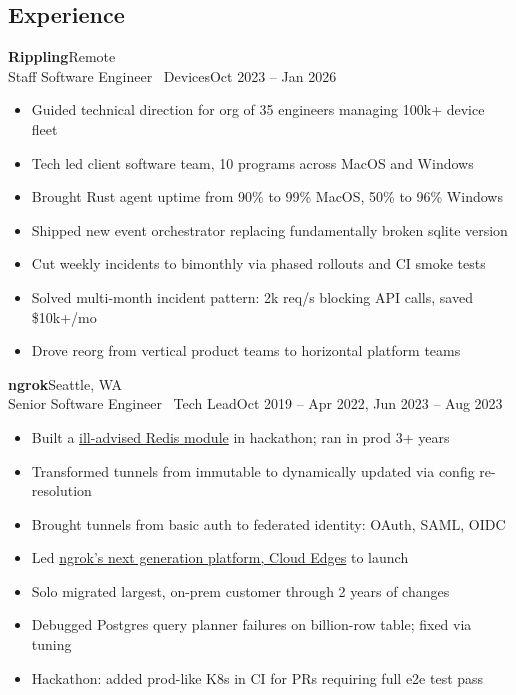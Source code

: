 \documentclass[margin]{res}
\begin{document}
  \begin{resume}
    \section{Experience}
       \textbf{Rippling}\hfill Remote\\
         Staff Software Engineer \textbar \ Devices\hfill Oct 2023 -- Jan 2026\\
         \begin{itemize} \itemsep -1pt  %
            \item Guided technical direction for org of 35 engineers managing 100k+ device fleet
            \item Tech led client software team, 10 programs across MacOS and Windows
            \item Brought Rust agent uptime from 90\% to 99\% MacOS, 50\% to 96\% Windows
            \item Shipped new event orchestrator replacing fundamentally broken sqlite version
            \item Cut weekly incidents to bimonthly via phased rollouts and CI smoke tests
            \item Solved multi-month incident pattern: 2k req/s blocking API calls, saved \$10k+/mo
            \item Drove reorg from vertical product teams to horizontal platform teams
         \end{itemize}

       \textbf{ngrok}\hfill Seattle, WA\\
         Senior Software Engineer \textbar \ Tech Lead\hfill Oct 2019 -- Apr 2022, Jun 2023 -- Aug 2023\\
         \begin{itemize} \itemsep -1pt  %
            \item Built a \href{https://github.com/brhoades/redis-loadmodbytes}{ill-advised Redis module} in hackathon; ran in prod 3+ years
            \item Transformed tunnels from immutable to dynamically updated via config re-resolution
            \item Brought tunnels from basic auth to federated identity: OAuth, SAML, OIDC
            \item Led \href{https://ngrok.com/next-generation}{ngrok's next generation platform, Cloud Edges} to launch
            \item Solo migrated largest, on-prem customer through 2 years of changes
            \item Debugged Postgres query planner failures on billion-row table; fixed via tuning
            \item Hackathon: added prod-like K8s in CI for PRs requiring full e2e test pass
         \end{itemize}


\end{resume}
\end{document}
